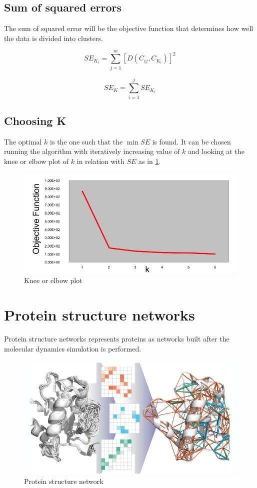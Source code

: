 	\subsection{Sum of squared errors}
	The sum of squared error will be the objective function that determines how well the data is divided into clusters.

	$$SE_{K_i} = \sum\limits_{j=1}^m[D(C_{ij}, C_{K_i})]^2$$

	$$SE_K = \sum\limits_{i=1}^jSE_{K_i}$$

	\subsection{Choosing K}
	The optimal $k$ is the one such that the $\min SE$ is found.
	It can be chosen running the algorithm with iteratively increasing value of $k$ and looking at the knee or elbow plot of $k$ in relation with $SE$ as in \ref{fig:elbow}.

	\begin{figure}[H]
		\includegraphics[width=\textwidth]{elbow}
		\caption{Knee or elbow plot}
		\label{fig:elbow}
	\end{figure}

\section{Protein structure networks}
Protein structure networks represents proteins as networks built after the molecular dynamics simulation is performed.

\begin{figure}[H]
	\includegraphics[width=\textwidth]{psn}
	\caption{Protein structure network}
	\label{fig:psn}
\end{figure}

